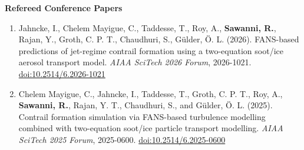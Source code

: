\documentclass[11pt,a4paper]{article}
\begin{document}
		\vspace*{6pt}
		\noindent\textbf{Refereed Conference Papers}
		\begin{enumerate}
		\item Jahncke, I., Chelem Mayigue, C., Taddesse, T., Roy, A., \textbf{Sawanni, R.}, Rajan, Y., Groth, C. P. T., Chaudhuri, S., Gülder, Ö. L. (2026). FANS-based predictions of jet-regime contrail formation using a two-equation soot/ice aerosol transport model. \emph{AIAA SciTech 2026 Forum}, 2026-1021. \href{https://doi.org/10.2514/6.2026-1021}{doi:10.2514/6.2026-1021}
		\item Chelem Mayigue, C., Jahncke, I., Taddesse, T., Groth, C. P. T., Roy, A., \textbf{Sawanni, R.}, Rajan, Y. T., Chaudhuri, S., and Gülder, Ö. L. (2025). Contrail formation simulation via FANS-based turbulence modelling combined with two-equation soot/ice particle transport modelling. \emph{AIAA SciTech 2025 Forum}, 2025-0600. \href{https://doi.org/10.2514/6.2025-0600}{doi:10.2514/6.2025-0600}
	\end{enumerate}
\end{document}
